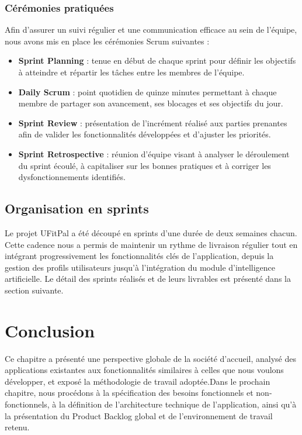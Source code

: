 ﻿\documentclass[a4paper,12pt]{report}
\begin{document}
\subsubsection{Cérémonies pratiquées}
Afin d'assurer un suivi régulier et une communication efficace au sein de l'équipe, nous 
avons mis en place les cérémonies Scrum suivantes :
\begin{itemize}
    \item \textbf{Sprint Planning} : tenue en début de chaque sprint pour définir les 
    objectifs à atteindre et répartir les tâches entre les membres de l'équipe.
    \item \textbf{Daily Scrum} : point quotidien de quinze minutes permettant à chaque 
    membre de partager son avancement, ses blocages et ses objectifs du jour.
    \item \textbf{Sprint Review} : présentation de l'incrément réalisé aux parties 
    prenantes afin de valider les fonctionnalités développées et d'ajuster les priorités.
    \item \textbf{Sprint Retrospective} : réunion d'équipe visant à analyser le déroulement 
    du sprint écoulé, à capitaliser sur les bonnes pratiques et à corriger les 
    dysfonctionnements identifiés.
\end{itemize}

\subsection{Organisation en sprints}
Le projet UFitPal a été découpé en sprints d'une durée de deux semaines chacun. Cette 
cadence nous a permis de maintenir un rythme de livraison régulier tout en intégrant 
progressivement les fonctionnalités clés de l'application, depuis la gestion des profils 
utilisateurs jusqu'à l'intégration du module d'intelligence artificielle. Le détail des 
sprints réalisés et de leurs livrables est présenté dans la section suivante.


\section{Conclusion }
Ce chapitre a présenté une perspective globale de la société d'accueil, analysé des applications 
existantes aux fonctionnalités similaires à celles que nous voulons développer, et exposé la 
méthodologie de travail adoptée.Dans le prochain chapitre, nous procédons à la 
spécification des besoins fonctionnels et non-fonctionnels, à la définition de l'architecture 
technique de l'application, ainsi qu'à la présentation du Product Backlog global et de 
l'environnement de travail retenu.
\end{document}
